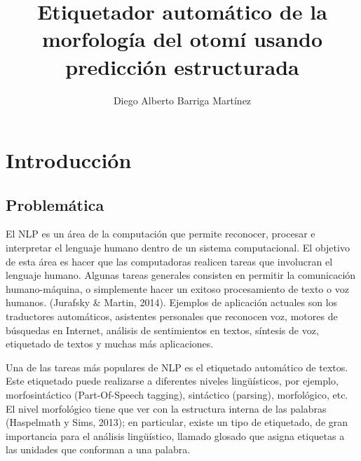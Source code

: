 \documentclass[letterpaper,12pt,oneside]{book}
\begin{document}

	
	\author{Diego Alberto Barriga Martínez}

	\title{Etiquetador automático de la morfología del otomí usando predicción estructurada}

	\tableofcontents

	\maketitle

	


	
	\chapter{Introducción}

	

	
	\section{Problemática}

	

	El NLP es un área de la computación que permite reconocer, procesar e interpretar el lenguaje humano dentro de un sistema computacional. El objetivo de esta área es hacer que las computadoras realicen tareas que involucran el lenguaje humano. Algunas tareas generales consisten en permitir la comunicación humano-máquina, o simplemente hacer un exitoso procesamiento de texto o voz humanos. (Jurafsky \& Martin, 2014). Ejemplos de aplicación actuales son los traductores automáticos, asistentes personales que reconocen voz, motores de búsquedas en Internet, análisis de sentimientos en textos,  síntesis de voz, etiquetado de textos y muchas más aplicaciones.

	

	Una de las tareas más populares de NLP es el etiquetado automático de textos. Este etiquetado puede realizarse a diferentes niveles lingüísticos, por ejemplo, morfosintáctico (Part-Of-Speech tagging), sintáctico (parsing), morfológico, etc.  El nivel morfológico tiene que ver con la estructura interna de las palabras (Haspelmath y Sims, 2013); en particular, existe un tipo de etiquetado, de gran importancia para el análisis lingüístico, llamado glosado que asigna etiquetas a las unidades que conforman a una palabra. 
\end{document}
